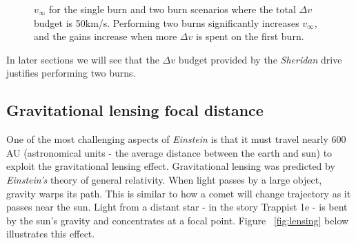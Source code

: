 \documentclass[12pt]{article} %
\begin{document}
\begin{figure}[H]
\caption{$v_{\infty}$ for the single burn and two burn scenarios where the total $\Delta v$ budget is 50km/s. Performing two burns significantly increases $v_{\infty}$, and the gains increase when more $\Delta v$ is spent on the first burn.}
\label{fig:highdv}
\end{figure}

In later sections we will see that the $\Delta v$ budget provided by the \textit{Sheridan} drive justifies performing two burns.


\subsection{Gravitational lensing focal distance}
\label{subsec: lensing}
One of the most challenging aspects of \textit{Einstein} is that it must travel nearly 600 AU (astronomical units - the average distance between the earth and sun) to exploit the gravitational lensing effect. Gravitational lensing was predicted by \textit{Einstein's} theory of general relativity. When light passes by a large object, gravity warps its path. This is similar to how a comet will change trajectory as it passes near the sun. Light from a distant star - in the story Trappist 1e - is bent by the sun's gravity and concentrates at a focal point. Figure ~\ref{fig:lensing} below illustrates this effect.
\end{document}
